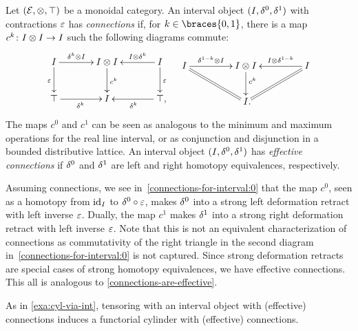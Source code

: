 \documentclass[reqno,10pt,a4paper,oneside,draft]{amsart}
\begin{document}
\begin{example} \label{exa:connections-for-interval}
Let $(\mathcal{E}, \otimes, \top)$ be a monoidal category.
An interval object $(I, \delta^0, \delta^1)$ with contractions $\varepsilon$ has \emph{connections} if, for $k \in \braces{0, 1}$, there is a map $c^k \colon I \otimes I \to I$ such the following diagrams commute:
\begin{align} \label{connections-for-interval:0}
\begin{aligned}
\xymatrix@C+1em{
  \interval
  \ar[r]^-{\kcyl \otimes \interval}
  \ar[d]_{\ccyl}
&
  \interval \otimes \interval
  \ar[d]^{c^k}
&
  \interval
  \ar[l]_-{\interval \otimes \kcyl}
  \ar[d]^{\ccyl}
\\
  \top
  \ar[r]_{\kcyl}
&
  \interval
&
  \top
  \ar[l]^{\kcyl}
\rlap{,}}
\end{aligned}
&&
\begin{aligned}
\xymatrix@C+2em{
  \interval
  \ar[r]^-{\kcylinv \otimes \interval}
  \ar@{=}[dr]
&
  \interval \otimes \interval
  \ar[d]^(0.4){c^k}
&
  \interval
  \ar[l]_-{\interval \otimes \kcylinv}
  \ar@{=}[dl]
\\&
  \interval
\rlap{.}}
\end{aligned}
\end{align}
The maps $c^0$ and $c^1$ can be seen as analogous to the minimum and maximum operations for the real line interval, or as conjunction and disjunction in a bounded distributive lattice.
An interval object $(I, \delta^0, \delta^1)$ has \emph{effective connections} if $\delta^0$ and $\delta^1$ are left and right homotopy equivalences, respectively.

Assuming connections, we see in~\eqref{connections-for-interval:0} that the map $c^0$, seen as a homotopy from $\operatorname{id}_I$ to $\delta^0 \mathbin{\circ} \varepsilon$, makes $\delta^0$ into a strong left deformation retract with left inverse $\varepsilon$.
Dually, the map $c^1$ makes $\delta^1$ into a strong right deformation retract with left inverse $\varepsilon$.
Note that this is not an equivalent characterization of connections as commutativity of the right triangle in the second diagram in~\eqref{connections-for-interval:0} is not captured.
Since strong deformation retracts are special cases of strong homotopy equivalences, we have effective connections.
This all is analogous to \cref{connections-are-effective}.

As in \cref{exa:cyl-via-int}, tensoring with an interval object with (effective) connections induces a functorial cylinder with (effective) connections.
\end{example}
\end{document}
